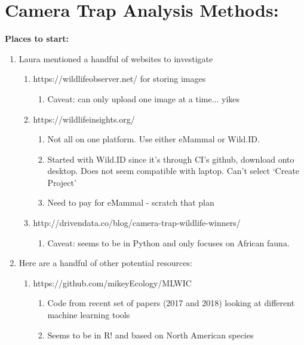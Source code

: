 \documentclass[11pt,a4paper]{article}\usepackage[]{graphicx}\usepackage[]{color}
\begin{document}
\section*{Camera Trap Analysis Methods:}
\textbf{Places to start:}
\begin{enumerate}
\item Laura mentioned a handful of websites to investigate
  \begin{enumerate}
  \item https://wildlifeobserver.net/ for storing images
    \begin{enumerate}
    \item Caveat: can only upload one image at a time... yikes
    \end{enumerate}
  \item https://wildlifeinsights.org/ 
    \begin{enumerate}
    \item Not all on one platform. Use either eMammal or Wild.ID. 
    \item Started with Wild.ID since it's through CI's github, download onto desktop. Does not seem compatible with laptop. Can't select `Create Project'
    \item Need to pay for eMammal - scratch that plan
    \end{enumerate}
  \item http://drivendata.co/blog/camera-trap-wildlife-winners/ 
    \begin{enumerate}
    \item Caveat: seems to be in Python and only focuses on African fauna. 
    \end{enumerate}
  \end{enumerate}
  
\item Here are a handful of other potential resources:
  \begin{enumerate}
  \item https://github.com/mikeyEcology/MLWIC
    \begin{enumerate}
    \item Code from recent set of papers (2017 and 2018) looking at different machine learning tools
    \item Seems to be in R! and based on North American species
    \end{enumerate}
\end{enumerate}
\end{enumerate}
\end{document}
